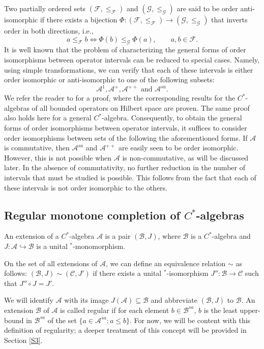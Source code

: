 \documentclass[12pt]{amsart}
\theoremstyle{definition}
\theoremstyle{remark}
\numberwithin{equation}{section}
\begin{document}
Two partially ordered sets  $ (\mathcal{F},\leq_{\mathcal{F}})$   and $(\mathcal{G}, \leq_{\mathcal{G}})$  are said to be order anti-isomorphic if there exists    a bijection  $\Phi: (\mathcal{F},\leq_{\mathcal{F}})\to (\mathcal{G},\leq_{\mathcal{G}})$  that inverts  order in both directions, i.e., $$a \leq_{\mathcal{F}}b\iff \Phi(b)\leq_{\mathcal{G}} \Phi(a), \qquad a,b\in \mathcal{F}.$$
It is well known that the problem of characterizing the general forms of order isomorphisms between operator intervals can be reduced to  special cases. Namely,  using simple  transformations, we can verify  that each of these intervals is either order isomorphic or  anti-isomorphic to one of the following subsets: $$\mathcal{A}^1,  \mathcal{A}^+,  \mathcal{A}^{++} \mbox{ and }  \mathcal{A}^{sa}.$$
We refer the reader to  \cite{Semrl} for a proof, where the corresponding results for the $C^*$-algebras of all bounded operators on  Hilbert space  are proven. The same proof also holds here for a general $C^*$-algebra. Consequently, to obtain the general forms of order isomorphisms between operator intervals, it suffices to consider order isomorphisms between sets of the following the aforementioned forms.
 If $\mathcal{A}$ is commutative, then $\mathcal{A}^{sa}$ and $\mathcal{A}^{++}$ are easily seen to be order isomorphic. However, this is not possible when $\mathcal{A}$ is non-commutative, as will be discussed later. In the absence of commutativity, no further reduction in the number of intervals that must be studied is possible. This follows from the fact that each of these intervals is not order isomorphic to the others.
\subsection{ Regular monotone completion  of   $C^*$-algebras}\label{2.2}

An extension of a $C^*$-algebra $\mathcal{A}$ is a pair $(\mathcal{B}, J)$, where $\mathcal{B}$ is a $C^*$-algebra and $J: \mathcal{A} \hookrightarrow \mathcal{B}$ is a unital $^*$-monomorphism.


On the set of all extensions of $\mathcal{A}$, we can define an  equivalence relation $\sim$ as follows: $(\mathcal{B}, J) \sim (\mathcal{C}, J')$ if there exists a unital $^*$-isomorphism $J'': \mathcal{B} \to \mathcal{C}$ such that $J'' \circ J = J'$.

We will identify $\mathcal{A}$ with its image $J(\mathcal{A}) \subseteq \mathcal{B}$ and abbreviate $(\mathcal{B}, J)$ to $\mathcal{B}$.   An extension $\mathcal{B}$ of $\mathcal{A}$ is called regular if for each element $b \in \mathcal{B}^{sa}$, $b$ is the least upper-bound in $\mathcal{B}^{sa}$ of the set $\{a\in\mathcal{A}^{sa} : a\leq b\}$. For now, we will be content with this definition of regularity; a deeper treatment of this concept will be provided in Section \ref{S3}. 
\end{document}
